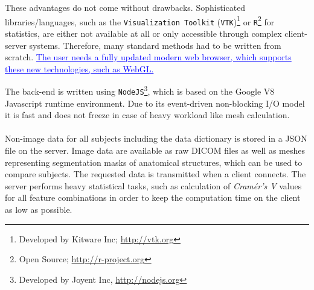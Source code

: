 \documentclass[journal]{style/vgtc} 			          %
\newcommand{\add}[1]{\textcolor{blue}{\uline{#1}}}
\begin{document}
These advantages do not come without drawbacks.
%
Sophisticated libraries/languages, such as the \texttt{Visualization Toolkit} (\texttt{VTK})\footnote{Developed by Kitware Inc; \url{http://vtk.org}} or \texttt{R}\footnote{Open Source; \url{http://r-project.org}} for statistics, are either not available at all or only accessible through complex client-server systems.
%
Therefore, many standard methods had to be written from scratch.
%
\add{The user needs a fully updated modern web browser, which supports these new technologies, such as WebGL.}
%

The back-end is written using \texttt{NodeJS}\footnote{Developed by Joyent Inc, \url{http://nodejs.org}}, which is based on the Google V8 Javascript runtime environment.
%
Due to its event-driven non-blocking I/O model it is fast and does not freeze in case of heavy workload like mesh calculation.
\\\\
Non-image data for all subjects including the data dictionary is stored in a JSON file on the server.
%
Image data are available as raw DICOM files as well as meshes representing segmentation masks of anatomical structures, which can be used to compare subjects.
%
The requested data is transmitted when a client connects.
%
The server performs heavy statistical tasks, such as calculation of \emph{Cram\'{e}r's V} values for all feature combinations in order to keep the computation time on the client as low as possible.
%
\end{document}
